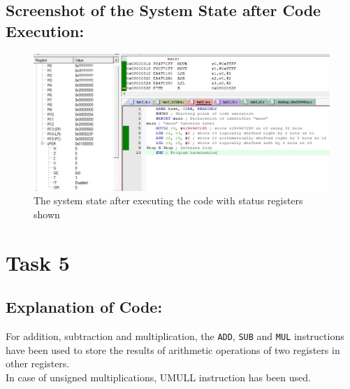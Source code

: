 \documentclass[12pt]{article}
\begin{document}
\subsection{Screenshot of the System State after Code Execution:}
\begin{figure}[ht]
    \centering
    \includegraphics[scale=.7]{images/lab3_2_ss2.jpg}
    \caption{The system state after executing the code with status registers shown}
    \label{fig:after_task_four}
\end{figure}
\pagebreak
\section{Task 5}
\subsection{Explanation of Code:}
For addition, subtraction and multiplication, the \verb|ADD|, \verb|SUB| and \verb|MUL| instructions have been used to store the results of arithmetic operations of two registers in other registers.\\
In case of unsigned multiplications, UMULL instruction has been used.\\
\end{document}
